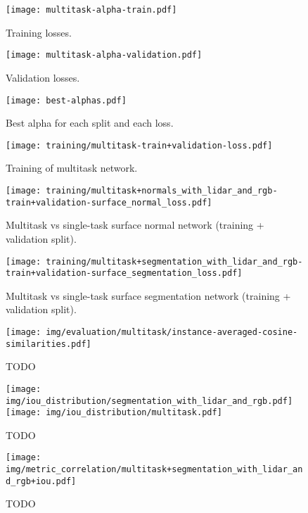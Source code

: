 \begin{figure}[H]
  \texttt{[image: multitask-alpha-train.pdf]}
  \caption{Training losses.}
\end{figure}

\begin{figure}[H]
  \texttt{[image: multitask-alpha-validation.pdf]}
  \caption{Validation losses.}
\end{figure}

\begin{figure}[H]
  \texttt{[image: best-alphas.pdf]}
  \caption{Best alpha for each split and each loss.}
\end{figure}

\begin{figure}[H]
  \texttt{[image: training/multitask-train+validation-loss.pdf]}
  \caption{Training of multitask network.}
\end{figure}

\begin{figure}[H]
  \texttt{[image: training/multitask+normals\_with\_lidar\_and\_rgb-train+validation-surface\_normal\_loss.pdf]}
  \caption{Multitask vs single-task surface normal network (training + validation split).}
\end{figure}

\begin{figure}[H]
  \texttt{[image: training/multitask+segmentation\_with\_lidar\_and\_rgb-train+validation-surface\_segmentation\_loss.pdf]}
  \caption{Multitask vs single-task surface segmentation network (training + validation split).}
\end{figure}

\begin{figure}[H]
  \texttt{[image: img/evaluation/multitask/instance-averaged-cosine-similarities.pdf]}
  \caption{TODO}
\end{figure}

\begin{figure}[H]
  \texttt{[image: img/iou\_distribution/segmentation\_with\_lidar\_and\_rgb.pdf]}
  \texttt{[image: img/iou\_distribution/multitask.pdf]}
  \caption{TODO}
\end{figure}

\begin{figure}[H]
  \texttt{[image: img/metric\_correlation/multitask+segmentation\_with\_lidar\_and\_rgb+iou.pdf]}
  \caption{TODO}
\end{figure}
